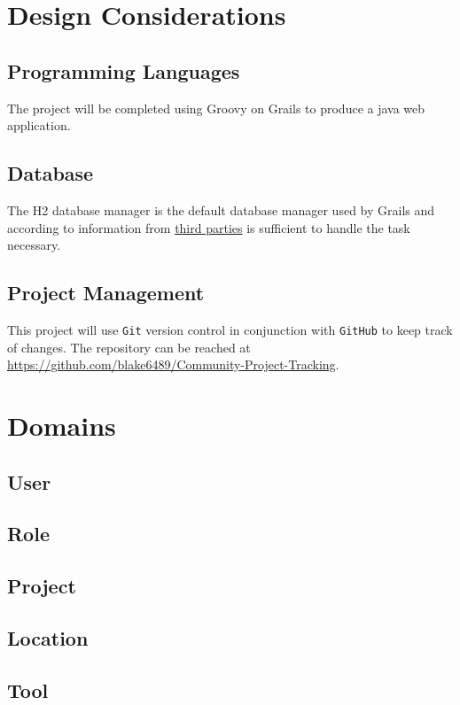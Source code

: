 \documentclass[12pt]{article}
\newcommand{\e}[1] {{\tt #1}}
\begin{document}
\section{Design Considerations}

\subsection{Programming Languages}
The project will be completed using Groovy on Grails to produce a java web application. 

\subsection{Database}
The H2 database manager is the default database manager used by Grails and according to information from \href{http://database-management-systems.findthebest.com/compare/16-30/H2-vs-MySQL}{third parties} is sufficient to handle the task necessary.

\subsection{Project Management}
This project will use \e{Git} version control in conjunction with \e{GitHub} to keep track of changes. The repository can be reached at \url{https://github.com/blake6489/Community-Project-Tracking}.

\section{Domains}\label{sec:Domains}
\subsection{User}
\subsection{Role}
\subsection{Project}
\subsection{Location}
\subsection{Tool}
\end{document}
